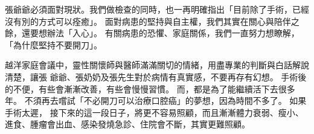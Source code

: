 \documentclass[12pt, a4paper]{article}
\begin{document}



張爺爺必須面對現狀。我們做檢查的同時，也一再明確指出「目前除了手術，已經沒有別的方式可以痊癒」。
面對病患的堅持與自主權，我們其實在關心與陪伴之餘，還要想辦法「入心」。
有關病患的恐懼、家庭關係，我們一直努力想瞭解，「為什麼堅持不要開刀」。


越洋家庭會議中，靈性關懷師與醫師滿滿關切的情緒，用盡專業的判斷與白話解說清楚，讓張 爺爺、張奶奶及張先生對於病情有真實感，不要再存有幻想。
手術後的不便，有些會漸漸改善，有些會慢慢習慣。
而，都是為了能繼續活下去很多年。
不須再去嚐試「不必開刀可以治療口腔癌」的夢想，因為時間不多了。
如果手術太遲，%
接下來的這一段日子，將更不容易照顧，而且漸漸體力衰弱、瘦小、進食、腫瘤會出血、感染發燒急診、住院會不斷，其實更難照顧。
\end{document}
